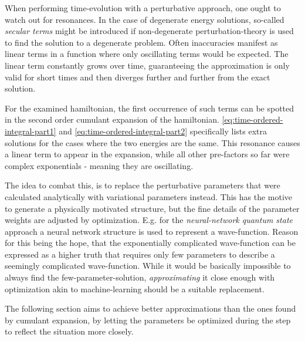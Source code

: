 When performing time-evolution with a perturbative approach, one ought to watch out for resonances.
In the case of degenerate energy solutions, so-called \emph{secular terms} \cite{secularTermsPerturbation} might be introduced if non-degenerate perturbation-theory is used to find the solution to a degenerate problem. 
Often inaccuracies manifest as linear terms in a function where only oscillating terms would be expected.
The linear term constantly grows over time, guaranteeing the approximation is only valid for short times and then diverges further and further from the exact solution.

For the examined hamiltonian, the first occurrence of such terms can be spotted in the second order cumulant expansion of the hamiltonian.
\autoref{eq:time-ordered-integral-part1} and \autoref{eq:time-ordered-integral-part2} specifically lists extra solutions for the cases where the two energies are the same.
This resonance causes a linear term to appear in the expansion, while all other pre-factors so far were complex exponentials - meaning they are oscillating.

The idea to combat this, is to replace the perturbative parameters that were calculated analytically with variational parameters instead.
This has the motive to generate a physically motivated structure, but the fine details of the parameter weights are adjusted by optimization.
E.g. for the \emph{neural-network quantum state} \cite{neuralNetworkQuantumStates} approach a neural network structure is used to represent a wave-function.
Reason for this being the hope, that the exponentially complicated wave-function can be expressed as a \glqq higher truth\grqq{} that requires only few parameters to describe a seemingly complicated wave-function.
While it would be basically impossible to always find the few-parameter-solution, \emph{approximating} it close enough with optimization akin to machine-learning should be a suitable replacement.

The following section aims to achieve better approximations than the ones found by cumulant expansion, by letting the parameters be optimized during the step to reflect the situation more closely.